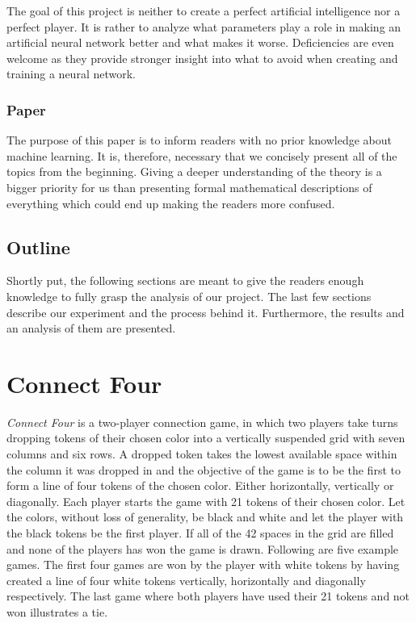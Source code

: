 \documentclass[titlepage]{article}
\begin{document}
The goal of this project is neither to create a perfect artificial intelligence nor a perfect player. It is rather to analyze what parameters play a role in making an artificial neural network better and what makes it worse. Deficiencies are even welcome as they provide stronger insight into what to avoid when creating and training a neural network. 

\subsubsection{Paper}

\vskip 0.2cm

The purpose of this paper is to inform readers with no prior knowledge about machine learning. It is, therefore, necessary that we concisely present all of the topics from the beginning. Giving a deeper understanding of the theory is a bigger priority for us than presenting formal mathematical descriptions of everything which could end up making the readers more confused. 

\subsection{Outline}

\vskip 0.2cm

Shortly put, the following sections are meant to give the readers enough knowledge to fully grasp the analysis of our project. The last few sections describe our experiment and the process behind it. Furthermore, the results and an analysis of them are presented.

\newpage

\section{Connect Four}

\vskip 0.5cm

\emph{Connect Four} is a two-player connection game, in which two players take turns dropping tokens of their chosen color into a vertically suspended grid with seven columns and six rows. A dropped token takes the lowest available space within the column it was dropped in and the objective of the game is to be the first to form a line of four tokens of the chosen color. Either horizontally, vertically or diagonally. Each player starts the game with 21 tokens of their chosen color. Let the colors, without loss of generality, be black and white and let the player with the black tokens be the first player. If all of the 42 spaces in the grid are filled and none of the players has won the game is drawn. Following are five example games. The first four games are won by the player with white tokens by having created a line of four white tokens vertically, horizontally and diagonally respectively. The last game where both players have used their 21 tokens and not won illustrates a tie.
\end{document}
